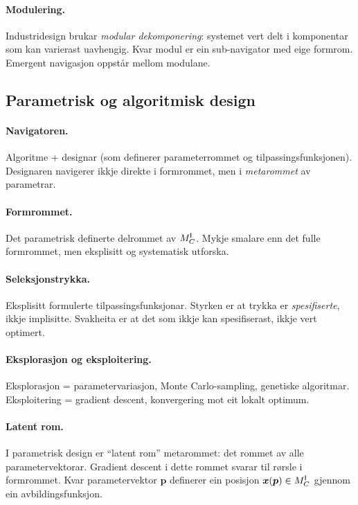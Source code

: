 \paragraph{Modulering.}
Industridesign brukar \emph{modular dekomponering}: systemet vert
delt i komponentar som kan varierast uavhengig. Kvar modul er ein
sub-navigator med eige formrom. Emergent navigasjon oppstår
mellom modulane.

\subsection{Parametrisk og algoritmisk design}

\paragraph{Navigatoren.}
Algoritme + designar (som definerer parameterrommet og
tilpassingsfunksjonen). Designaren navigerer ikkje direkte i
formrommet, men i \emph{metarommet} av parametrar.

\paragraph{Formrommet.}
Det parametrisk definerte delrommet av $M^{\mathsf{I}}_C$. Mykje smalare enn
det fulle formrommet, men eksplisitt og systematisk utforska.

\paragraph{Seleksjonstrykka.}
Eksplisitt formulerte tilpassingsfunksjonar. Styrken er at
trykka er \emph{spesifiserte}, ikkje implisitte. Svakheita er at
det som ikkje kan spesifiserast, ikkje vert optimert.

\paragraph{Eksplorasjon og eksploitering.}
Eksplorasjon = parametervariasjon, Monte Carlo-sampling,
genetiske algoritmar. Eksploitering = gradient descent,
konvergering mot eit lokalt optimum.

\paragraph{Latent rom.}
I parametrisk design er ``latent rom'' metarommet: det rommet av
alle parametervektorar. Gradient descent i dette rommet svarar
til rørsle i formrommet. Kvar parametervektor $\bm{p}$ definerer
ein posisjon $\bm{x}(\bm{p}) \in M^{\mathsf{I}}_C$ gjennom ein avbildingsfunksjon.

